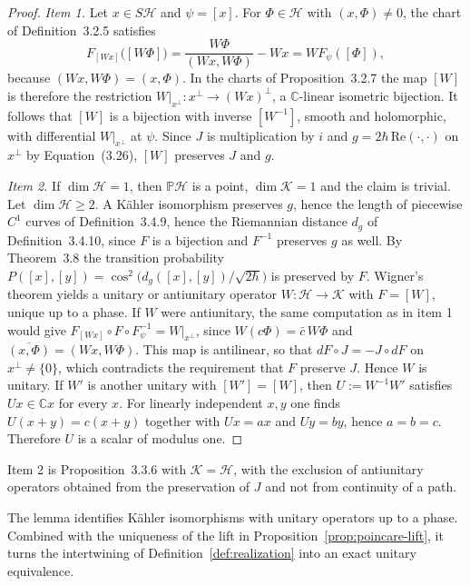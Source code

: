 \begin{proof}
	\emph{Item 1.} Let $x\in S\mathcal{H}$ and $\psi=[x]$. For $\Phi\in\mathcal{H}$ with $(x,\Phi)\neq0$, the chart of Definition~3.2.5 satisfies
	\begin{equation*}
		F_{[Wx]}\big([W\Phi]\big)=\frac{W\Phi}{(Wx,W\Phi)}-Wx=W F_\psi([\Phi]),
	\end{equation*}
	because $(Wx,W\Phi)=(x,\Phi)$. In the charts of Proposition~3.2.7 the map $[W]$ is therefore the restriction $W|_{x^\perp}:x^\perp\to(Wx)^\perp$, a $\mathbb{C}$-linear isometric bijection. It follows that $[W]$ is a bijection with inverse $[W^{-1}]$, smooth and holomorphic, with differential $W|_{x^\perp}$ at $\psi$. Since $J$ is multiplication by $i$ and $g=2\hbar\,\mathrm{Re}(\cdot,\cdot)$ on $x^\perp$ by Equation~(3.26), $[W]$ preserves $J$ and $g$.
	
	\emph{Item 2.} If $\dim\mathcal{H}=1$, then $\mathbb{P}\mathcal{H}$ is a point, $\dim\mathcal{K}=1$ and the claim is trivial. Let $\dim\mathcal{H}\geq2$. A Kähler isomorphism preserves $g$, hence the length of piecewise $C^1$ curves of Definition~3.4.9, hence the Riemannian distance $d_g$ of Definition~3.4.10, since $F$ is a bijection and $F^{-1}$ preserves $g$ as well. By Theorem~3.8 the transition probability $P([x],[y])=\cos^2\!\big(d_g([x],[y])/\sqrt{2\hbar}\big)$ is preserved by $F$. Wigner's theorem \cite[TODO-location]{TODO-Mor18} yields a unitary or antiunitary operator $W:\mathcal{H}\to\mathcal{K}$ with $F=[W]$, unique up to a phase. If $W$ were antiunitary, the same computation as in item 1 would give $F_{[Wx]}\circ F\circ F_\psi^{-1}=W|_{x^\perp}$, since $W(c\Phi)=\bar{c}\,W\Phi$ and $\overline{(x,\Phi)}=(Wx,W\Phi)$. This map is antilinear, so that $dF\circ J=-J\circ dF$ on $x^\perp\neq\{0\}$, which contradicts the requirement that $F$ preserve $J$. Hence $W$ is unitary. If $W'$ is another unitary with $[W']=[W]$, then $U:=W^{-1}W'$ satisfies $Ux\in\mathbb{C}x$ for every $x$. For linearly independent $x,y$ one finds $U(x+y)=c(x+y)$ together with $Ux=ax$ and $Uy=by$, hence $a=b=c$. Therefore $U$ is a scalar of modulus one.
\end{proof}

\noindent Item 2 is Proposition~3.3.6 with $\mathcal{K}=\mathcal{H}$, with the exclusion of antiunitary operators obtained from the preservation of $J$ and not from continuity of a path.

The lemma identifies Kähler isomorphisms with unitary operators up to a phase. Combined with the uniqueness of the lift in Proposition~\ref{prop:poincare-lift}, it turns the intertwining of Definition~\ref{def:realization} into an exact unitary equivalence.

